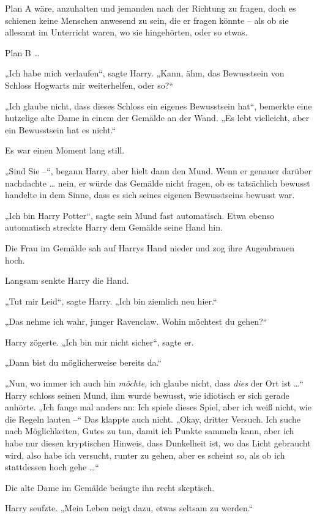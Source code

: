 {Plan A wäre, anzuhalten und jemanden nach der Richtung zu fragen, doch es schienen keine Menschen anwesend zu sein, die er fragen könnte -- als ob sie allesamt im Unterricht waren, wo sie hingehörten, oder so etwas.

Plan B …

„Ich habe mich verlaufen“, sagte Harry. „Kann, ähm, das Bewusstsein von Schloss Hogwarts mir weiterhelfen, oder so?“

„Ich glaube nicht, dass dieses Schloss ein eigenes Bewusstsein hat“, bemerkte eine hutzelige alte Dame in einem der Gemälde an der Wand. „Es lebt vielleicht, aber ein Bewusstsein hat es nicht.“

Es war einen Moment lang still.

„Sind Sie --“, begann Harry, aber hielt dann den Mund. Wenn er genauer darüber nachdachte … nein, er würde das Gemälde nicht fragen, ob es tatsächlich bewusst handelte in dem Sinne, dass es sich seines eigenen Bewusstseins bewusst war.

„Ich bin Harry Potter“, sagte sein Mund fast automatisch. Etwa ebenso automatisch streckte Harry dem Gemälde seine Hand hin.

Die Frau im Gemälde sah auf Harrys Hand nieder und zog ihre Augenbrauen hoch.

Langsam senkte Harry die Hand.

„Tut mir Leid“, sagte Harry. „Ich bin ziemlich neu hier.“

„Das nehme ich wahr, junger Ravenclaw. Wohin möchtest du gehen?“

Harry zögerte. „Ich bin mir nicht sicher“, sagte er.

„Dann bist du möglicherweise bereits da.“

„Nun, wo immer ich auch hin \emph{möchte,} ich glaube nicht, dass \emph{dies} der Ort ist …“ Harry schloss seinen Mund, ihm wurde bewusst, wie idiotisch er sich gerade anhörte. „Ich fange mal anders an: Ich spiele dieses Spiel, aber ich weiß nicht, wie die Regeln lauten --“ Das klappte auch nicht. „Okay, dritter Versuch. Ich suche nach Möglichkeiten, Gutes zu tun, damit ich Punkte sammeln kann, aber ich habe nur diesen kryptischen Hinweis, dass Dunkelheit ist, wo das Licht gebraucht wird, also habe ich versucht, runter zu gehen, aber es scheint so, als ob ich stattdessen hoch gehe …“

Die alte Dame im Gemälde beäugte ihn recht skeptisch.

Harry seufzte. „Mein Leben neigt dazu, etwas seltsam zu werden.“

}
